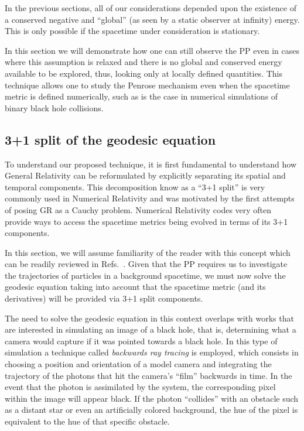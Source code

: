 In the previous sections, all of our considerations depended upon the existence of a conserved negative and ``global'' (as seen by a static observer at infinity) energy. This is only possible if the spacetime under consideration is stationary. 

In this section we will demonstrate how one can still observe the \ac{PP} even in cases where this assumption is relaxed and there is no global and conserved energy available to be explored, thus, looking only at locally defined quantities. This technique allows one to study the Penrose mechanism even when the spacetime metric is defined numerically, such as is the case in numerical simulations of binary black hole collisions.

\subsection{3+1 split of the geodesic equation}

To understand our proposed technique, it is first fundamental to understand how General Relativity can be reformulated by explicitly separating its spatial and temporal components. This decomposition know as a ``3+1 split'' is very commonly used in Numerical Relativity and was motivated by the first attempts of posing \ac{GR} as a Cauchy problem. Numerical Relativity codes very often provide ways to access the spacetime metrics being evolved in terms of its 3+1 components.

In this section, we will assume familiarity of the reader with this concept which can be readily reviewed in Refs.~\cite{Alcubierre2012-xp, 9780521514071, 9781108928250}. Given that the \ac{PP} requires us to investigate the trajectories of particles in a background spacetime, we must now solve the geodesic equation taking into account that the spacetime metric (and its derivatives) will be provided via 3+1 split components. 

The need to solve the geodesic equation in this context overlaps with works that are interested in simulating an image of a black hole, that is, determining what a camera would capture if it was pointed towards a black hole. In this type of simulation a technique called \emph{backwards ray tracing} is employed, which consists in choosing a position and orientation of a model camera and integrating the trajectory of the photons that hit the camera's ``film'' backwards in time. In the event that the photon is assimilated by the system, the corresponding pixel within the image will appear black. If the photon ``collides'' with an obstacle such as a distant star or even an artificially colored background, the hue of the pixel is equivalent to the hue of that specific obstacle.

